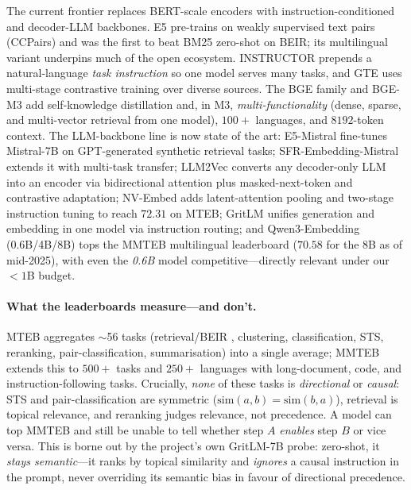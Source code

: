 The current frontier replaces BERT-scale encoders with instruction-conditioned and
decoder-LLM backbones. E5 \citep{emb:wang2022e5} pre-trains on weakly supervised text
pairs (CCPairs) and was the first to beat BM25 zero-shot on BEIR; its multilingual
variant underpins much of the open ecosystem. INSTRUCTOR \citep{emb:su2023instructor}
prepends a natural-language \emph{task instruction} so one model serves many tasks,
and GTE \citep{emb:li2023gte} uses multi-stage contrastive training over diverse
sources. The BGE family \citep{emb:xiao2023bge} and BGE-M3 \citep{emb:chen2024bgem3}
add self-knowledge distillation and, in M3, \emph{multi-functionality} (dense,
sparse, and multi-vector retrieval from one model), $100{+}$ languages, and
$8192$-token context. The LLM-backbone line is now state of the art: E5-Mistral
\citep{emb:wang2024mistrale5} fine-tunes Mistral-7B on GPT-generated synthetic
retrieval tasks; SFR-Embedding-Mistral \citep{emb:sfr2024embedding} extends it with
multi-task transfer; LLM2Vec \citep{emb:behnamghader2024llm2vec} converts any
decoder-only LLM into an encoder via bidirectional attention plus masked-next-token
and contrastive adaptation; NV-Embed \citep{emb:lee2025nvembed} adds latent-attention
pooling and two-stage instruction tuning to reach $72.31$ on MTEB; GritLM
\citep{emb:muennighoff2024gritlm} unifies generation and embedding in one model via
instruction routing; and Qwen3-Embedding \citep{emb:zhang2025qwen3emb} (0.6B/4B/8B)
tops the MMTEB multilingual leaderboard ($70.58$ for the 8B as of mid-2025), with even
the \emph{0.6B} model competitive---directly relevant under our $<\!1$B budget.

\paragraph{What the leaderboards measure---and don't.}
MTEB \citep{emb:muennighoff2023mteb} aggregates $\sim$56 tasks (retrieval/BEIR
\citep{emb:thakur2021beir}, clustering, classification, STS, reranking,
pair-classification, summarisation) into a single average; MMTEB
\citep{emb:enevoldsen2025mmteb} extends this to $500{+}$ tasks and $250{+}$ languages
with long-document, code, and instruction-following tasks. Crucially, \emph{none} of
these tasks is \emph{directional} or \emph{causal}: STS and pair-classification are
symmetric ($\mathrm{sim}(a,b)=\mathrm{sim}(b,a)$), retrieval is topical relevance, and
reranking judges relevance, not precedence. A model can top MMTEB and still be unable
to tell whether step $A$ \emph{enables} step $B$ or vice versa. This is borne out by
the project's own GritLM-7B probe: zero-shot, it \emph{stays semantic}---it ranks by
topical similarity and \emph{ignores} a causal instruction in the prompt, never
overriding its semantic bias in favour of directional precedence.

